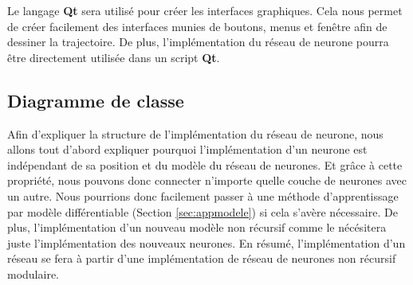 \documentclass[12pt,a4paper,oneside, titlepage]{article}
\begin{document}
Le langage \textbf{Qt} sera utilisé pour créer les interfaces graphiques.
Cela nous permet de créer facilement des interfaces munies de boutons, menus et fenêtre afin de dessiner la trajectoire.
De plus, l'implémentation du réseau de neurone pourra être directement utilisée dans un script \textbf{Qt}.

\subsection{Diagramme de classe}
Afin d'expliquer la structure de l'implémentation du réseau de neurone, nous allons tout d'abord expliquer pourquoi l'implémentation d'un neurone est indépendant de sa position et du modèle du réseau de neurones.
Et grâce à cette propriété, nous pouvons donc connecter n'importe quelle couche de neurones avec un autre.
Nous pourrions donc facilement passer à une méthode d'apprentissage par modèle différentiable (Section \ref{sec:appmodele}) si cela s'avère nécessaire.
De plus, l'implémentation d'un nouveau modèle non récursif comme le \mlp nécésitera juste l'implémentation des nouveaux neurones.
En résumé, l'implémentation d'un réseau \rbf se fera à partir d'une implémentation de réseau de neurones non récursif modulaire.\\
\end{document}
